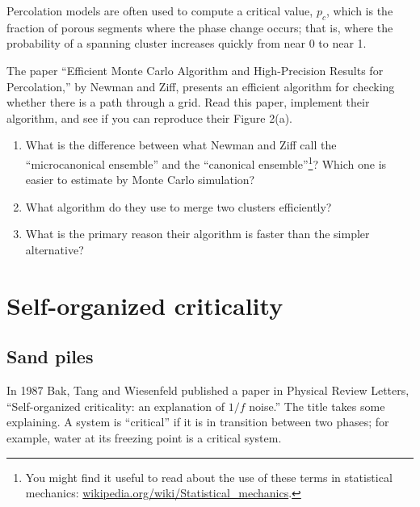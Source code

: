 \documentclass[10pt]{book}
\begin{document}
Percolation models are often used to compute a critical value,
$p_c$, which is the fraction of porous segments where the phase
change occurs; that is, where the probability of a spanning cluster
increases quickly from near 0 to near 1.

\begin{exercise}

The paper ``Efficient Monte Carlo Algorithm and High-Precision Results
for Percolation,'' by Newman and Ziff, presents an efficient algorithm
for checking whether there is a path through a grid.  Read this
paper, implement their algorithm, and see if you can reproduce their
Figure 2(a).

\begin{enumerate}

\item What is the difference between what Newman and Ziff call the
  ``microcanonical ensemble'' and the ``canonical
  ensemble''\footnote{You might find it useful to read about the use of
    these terms in statistical mechanics:
    \url{wikipedia.org/wiki/Statistical_mechanics}.}?  Which one is
  easier to estimate by Monte Carlo simulation?

\item What algorithm do they use to merge two clusters efficiently?

\item What is the primary reason their algorithm is faster than the
  simpler alternative?

\end{enumerate}

\end{exercise}




\chapter{Self-organized criticality}
\label{soc}
 
\section{Sand piles}

In 1987 Bak, Tang and Wiesenfeld published a paper in Physical Review
Letters, ``Self-organized criticality: an explanation of $1/f$ noise.''
The title takes some explaining.  A system is ``critical'' if it is
in transition between two phases; for example, water at
its freezing point is a critical system.
\end{document}
